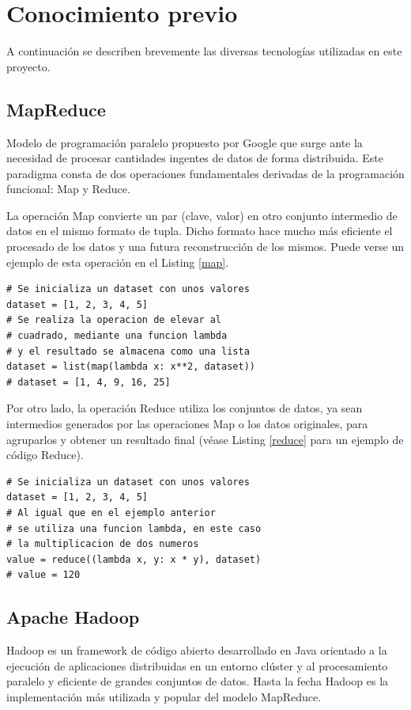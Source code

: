 \documentclass[conference]{IEEEtran}
\begin{document}
\section{Conocimiento previo}

A continuación se describen brevemente las diversas tecnologías utilizadas en este proyecto.

\subsection{MapReduce}
Modelo de programación paralelo propuesto por Google\cite{mapreduce} que surge ante la necesidad de procesar cantidades ingentes de datos de forma distribuida. Este paradigma consta de dos operaciones fundamentales derivadas de la programación funcional: Map y Reduce.

La operación Map convierte un par (clave, valor) en otro conjunto intermedio de datos en el mismo formato de tupla. Dicho formato hace mucho más eficiente el procesado de los datos y una futura reconstrucción de los mismos. Puede verse un ejemplo de esta operación en el Listing \ref{map}.\\

\begin{lstlisting}[style=pythonStyle, caption=Ejemplo de operación Map, label=map]
# Se inicializa un dataset con unos valores
dataset = [1, 2, 3, 4, 5]
# Se realiza la operacion de elevar al 
# cuadrado, mediante una funcion lambda
# y el resultado se almacena como una lista
dataset = list(map(lambda x: x**2, dataset))
# dataset = [1, 4, 9, 16, 25]
\end{lstlisting}

Por otro lado, la operación Reduce utiliza los conjuntos de datos, ya sean intermedios generados por las operaciones Map o los datos originales, para agruparlos y obtener un resultado final (véase Listing \ref{reduce} para un ejemplo de código Reduce).

\begin{lstlisting}[style=pythonStyle, caption=Ejemplo de operación Reduce, label=reduce]
# Se inicializa un dataset con unos valores
dataset = [1, 2, 3, 4, 5]
# Al igual que en el ejemplo anterior 
# se utiliza una funcion lambda, en este caso
# la multiplicacion de dos numeros
value = reduce((lambda x, y: x * y), dataset)
# value = 120
\end{lstlisting}

\subsection{Apache Hadoop}
Hadoop \cite{hadoop} es un framework de código abierto desarrollado en Java orientado a la ejecución de aplicaciones distribuidas en un entorno clúster y al procesamiento paralelo y eficiente de grandes conjuntos de datos. Hasta la fecha Hadoop es la implementación más utilizada y popular del modelo MapReduce.
\end{document}
